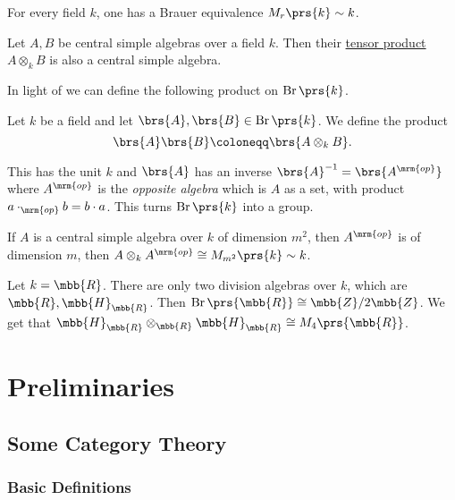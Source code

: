 \documentclass[11pt]{kbook}
\DeclareMathOperator{\Br}{Br}
\newcommand{\op}{{\mrm{op}}}
\begin{document}
\begin{example}
For every field $k$, one has a Brauer equivalence $M_r\prs{k} \sim k$.
\end{example}

\begin{proposition}\label{proposition:CSA_product}
Let $A,B$ be central simple algebras over a field $k$. Then their \href{https://en.wikipedia.org/wiki/Tensor_product_of_algebras}{tensor product} $A \otimes_k B$ is also a central simple algebra.
\end{proposition}

In light of  we can define the following product on $\Br\prs{k}$.

\begin{definition}
Let $k$ be a field and let $\brs{A},\brs{B} \in \Br\prs{k}$. We define the product
\[\brs{A} \brs{B} \coloneqq \brs{A \otimes_k B} \text{.}\]

This has the unit $k$ and $\brs{A}$ has an inverse $\brs{A}^{-1} = \brs{A^\op}$ where $A^\op$ is the \emph{opposite algebra} which is $A$ as a set, with product $a \cdot_\op b = b \cdot a$. This turns $\Br\prs{k}$ into a group.
\end{definition}

\begin{proposition}
If $A$ is a central simple algebra over $k$ of dimension $m^2$, then $A^\op$ is of dimension $m$, then $A \otimes_k A^\op \cong M_{m^2}\prs{k} \sim k$.
\end{proposition}

\begin{example}
Let $k = \mbb{R}$. There are only two division algebras over $k$, which are ${\mbb{R}, \mbb{H}_{\mbb{R}}}$. Then $\Br\prs{\mbb{R}} \cong \mbb{Z}/2\mbb{Z}$. We get that $\mbb{H}_{\mbb{R}} \otimes_{\mbb{R}} \mbb{H}_{\mbb{R}} \cong M_4\prs{\mbb{R}}$.
\end{example}

\chapter{Preliminaries}

\section{Some Category Theory}

\subsection{Basic Definitions}
\end{document}
